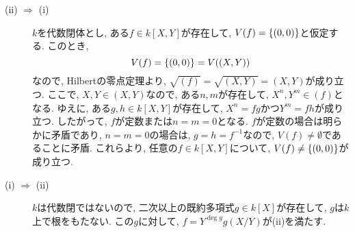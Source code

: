 \documentclass[dvipdfmx]{jsarticle}
\begin{document}
    \begin{description}
        \item[(ii) $\Rightarrow$ (i)]
            $k$を代数閉体とし, ある$f \in k[X,Y]$が存在して,
            $V(f) = \{(0,0)\}$と仮定する.
            このとき,
            \[
                V(f) = \{(0,0)\} = V((X,Y))
            \]
            なので, Hilbertの零点定理より, $\sqrt{(f)} = \sqrt{(X,Y)} = (X,Y)$が成り立つ.
            ここで, $X, Y \in (X,Y)$なので, ある$n, m$が存在して,
            $X^n ,Y^m \in (f)$となる.
            ゆえに, ある$g, h \in k[X, Y]$が存在して,
            $X^n = fg$かつ$Y^m = fh$が成り立つ.
            したがって, $f$が定数または$n  = m = 0$となる.
            $f$が定数の場合は明らかに矛盾であり,
            $n = m = 0$の場合は, $g = h = f^{-1}$なので,
            $V(f) \neq \emptyset$であることに矛盾.
            これらより, 任意の$f \in k[X, Y]$について, $V(f) \neq \{(0,0)\}$が成り立つ.
        \item[(i) $\Rightarrow$ (ii)]
            $k$は代数閉ではないので, 二次以上の既約多項式$g \in k[X]$が存在して, $g$は$k$上で根をもたない.
            この$g$に対して, $f = Y^{\deg{g}}g(X/Y)$が(ii)を満たす.
    \end{description}
\end{document}

